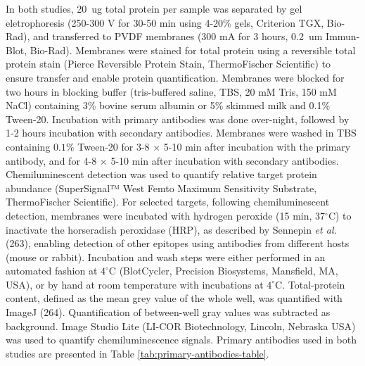 \documentclass[twoside,10pt]{gihclass} %
\begin{document}
In both studies, \SI{20}{ug} total protein per sample was separated by gel eletrophoresis (250-300 V for 30-50 min using 4-20\% gels, Criterion TGX, Bio-Rad), and transferred to PVDF membranes (300 mA for 3 hours, \SI{0.2}{um} Immun-Blot, Bio-Rad).
Membranes were stained for total protein using a reversible total protein stain (Pierce Reversible Protein Stain, ThermoFischer Scientific) to ensure transfer and enable protein quantification.
Membranes were blocked for two hours in blocking buffer (tris-buffered saline, TBS, 20 mM Tris, 150 mM NaCl) containing 3\% bovine serum albumin or 5\% skimmed milk and 0.1\% Tween-20.
Incubation with primary antibodies was done over-night, followed by 1-2 hours incubation with secondary antibodies.
Membranes were washed in TBS containing \(0.1\%\) Tween-20 for 3-8 \(\times\) 5-10 min after incubation with the primary antibody, and for 4-8 \(\times\) 5-10 min after incubation with secondary antibodies.
Chemiluminescent detection was used to quantify relative target protein abundance (SuperSignal™ West Femto Maximum Sensitivity Substrate, ThermoFischer Scientific).
For selected targets, following chemiluminescent detection, membranes were incubated with hydrogen peroxide (15 min, 37\(^{\circ}\)C) to inactivate the horseradish peroxidase (HRP), as described by Sennepin \emph{et al.} (263), enabling detection of other epitopes using antibodies from different hosts (mouse or rabbit).
Incubation and wash steps were either performed in an automated fashion at \(4^{\circ}\)C (BlotCycler, Precision Biosystems, Mansfield, MA, USA), or by hand at room temperature with incubations at \(4^{\circ}\)C.
Total-protein content, defined as the mean grey value of the whole well, was quantified with ImageJ (264). Quantification of between-well gray values was subtracted as background. Image Studio Lite (LI-COR Biotechnology, Lincoln, Nebraska USA) was used to quantify chemiluminescence signals. Primary antibodies used in both studies are presented in Table \ref{tab:primary-antibodies-table}.
\end{document}
